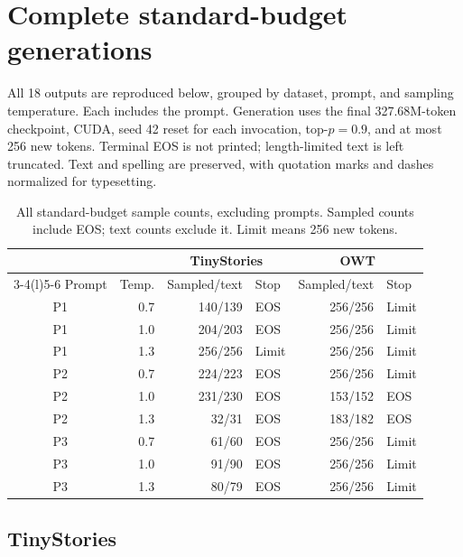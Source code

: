 \section{Complete standard-budget generations}
\label{app:standard_samples}

All 18 outputs are reproduced below, grouped by dataset, prompt, and
sampling temperature. Each includes the prompt. Generation uses the final
327.68M-token checkpoint, CUDA, seed 42 reset for each invocation,
top-$p=0.9$, and at most 256 new tokens. Terminal EOS is not printed;
length-limited text is left truncated. Text and spelling are preserved,
with quotation marks and dashes normalized for typesetting.


\begin{table}[htbp]
    \centering\small
    \begin{tabular}{@{}crrlrl@{}}
        \toprule
        & & \multicolumn{2}{c}{TinyStories} & \multicolumn{2}{c}{OWT} \\
        \cmidrule(lr){3-4}\cmidrule(l){5-6}
        Prompt & Temp. & Sampled/text & Stop & Sampled/text & Stop \\
        \midrule
        P1 & 0.7 & 140/139 & EOS & 256/256 & Limit \\
        P1 & 1.0 & 204/203 & EOS & 256/256 & Limit \\
        P1 & 1.3 & 256/256 & Limit & 256/256 & Limit \\
        P2 & 0.7 & 224/223 & EOS & 256/256 & Limit \\
        P2 & 1.0 & 231/230 & EOS & 153/152 & EOS \\
        P2 & 1.3 & 32/31 & EOS & 183/182 & EOS \\
        P3 & 0.7 & 61/60 & EOS & 256/256 & Limit \\
        P3 & 1.0 & 91/90 & EOS & 256/256 & Limit \\
        P3 & 1.3 & 80/79 & EOS & 256/256 & Limit \\
        \bottomrule
    \end{tabular}
    \caption{All standard-budget sample counts, excluding prompts. Sampled
    counts include EOS; text counts exclude it. Limit means 256 new tokens.}
    \label{tab:standard_generation_counts}
\end{table}
\FloatBarrier

\subsection{TinyStories}

